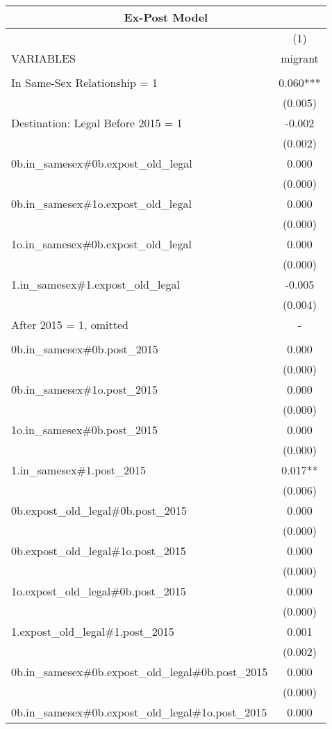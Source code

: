 \documentclass[]{article}
\begin{document}
\begin{tabular}{lc}
\multicolumn{2}{c}{Ex-Post Model} \\ \hline
 & (1) \\
VARIABLES & migrant \\ \hline
 &  \\
In Same-Sex Relationship = 1 & 0.060*** \\
 & (0.005) \\
Destination: Legal Before 2015 = 1 & -0.002 \\
 & (0.002) \\
0b.in\_samesex\#0b.expost\_old\_legal & 0.000 \\
 & (0.000) \\
0b.in\_samesex\#1o.expost\_old\_legal & 0.000 \\
 & (0.000) \\
1o.in\_samesex\#0b.expost\_old\_legal & 0.000 \\
 & (0.000) \\
1.in\_samesex\#1.expost\_old\_legal & -0.005 \\
 & (0.004) \\
After 2015 = 1, omitted & - \\
 &  \\
0b.in\_samesex\#0b.post\_2015 & 0.000 \\
 & (0.000) \\
0b.in\_samesex\#1o.post\_2015 & 0.000 \\
 & (0.000) \\
1o.in\_samesex\#0b.post\_2015 & 0.000 \\
 & (0.000) \\
1.in\_samesex\#1.post\_2015 & 0.017** \\
 & (0.006) \\
0b.expost\_old\_legal\#0b.post\_2015 & 0.000 \\
 & (0.000) \\
0b.expost\_old\_legal\#1o.post\_2015 & 0.000 \\
 & (0.000) \\
1o.expost\_old\_legal\#0b.post\_2015 & 0.000 \\
 & (0.000) \\
1.expost\_old\_legal\#1.post\_2015 & 0.001 \\
 & (0.002) \\
0b.in\_samesex\#0b.expost\_old\_legal\#0b.post\_2015 & 0.000 \\
 & (0.000) \\
0b.in\_samesex\#0b.expost\_old\_legal\#1o.post\_2015 & 0.000 \\

\end{tabular}
\end{document}
